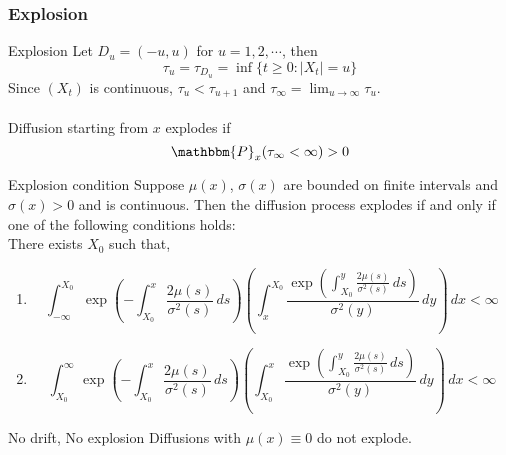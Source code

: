 \documentclass[12pt,a4paper]{article}
\begin{document}
    \subsubsection{Explosion}
    \begin{definition}{Explosion}{}
        Let $D_u = (-u,u)$ for $u=1,2,\cdots$, then
        $$
        \tau_u = \tau_{D_u} = \inf\{t\ge 0: |X_t|=u\}
        $$
        Since $(X_t)$ is continuous, $\tau_u<\tau_{u+1}$ and $\tau_\infty = \lim_{u\to\infty} \tau_u$.\\
        \\
        Diffusion starting from $x$ explodes if
        $$
        \mathbbm{P}_x(\tau_\infty<\infty)>0
        $$
    \end{definition}
    \begin{theorem}{Explosion condition}{}
        Suppose $\mu(x)$, $\sigma(x)$ are bounded on finite intervals and $\sigma(x)>0$ and is continuous. Then the diffusion process explodes if and only if one of the following conditions holds:
        \\
        There exists $X_0$ such that,
        \begin{enumerate}
            \item 
            $$
            \int_{-\infty}^{X_0} \exp\left(-\int_{X_0}^x\frac{2\mu(s)}{\sigma^2(s)}\, ds\right)\left(\int_x^{X_0} \frac{\exp\left(\int_{X_0}^y \frac{2\mu(s)}{\sigma^2(s)}\, ds\right)}{\sigma^2(y)}\, dy\right)\, dx<\infty
            $$
            \item 
            $$
            \int_{X_0}^{\infty} \exp\left(-\int_{X_0}^x\frac{2\mu(s)}{\sigma^2(s)}\, ds\right)\left(\int_{X_0}^{x} \frac{\exp\left(\int_{X_0}^y \frac{2\mu(s)}{\sigma^2(s)}\, ds\right)}{\sigma^2(y)}\, dy\right)\, dx<\infty
            $$
        \end{enumerate}
    \end{theorem}
    \begin{corollary}{No drift, No explosion}{}
        Diffusions with $\mu(x)\equiv 0$ do not explode.
    \end{corollary}
\end{document}
